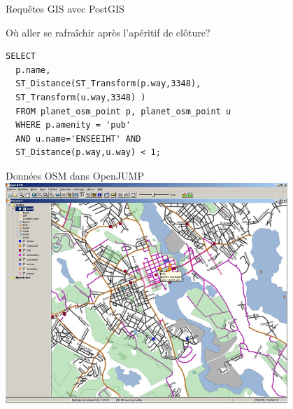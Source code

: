 \begin{frame}[fragile]{Requêtes GIS avec PostGIS} \vfill

Où aller se rafraîchir après l'apéritif de clôture?

\begin{verbatim}
SELECT
  p.name,
  ST_Distance(ST_Transform(p.way,3348),
  ST_Transform(u.way,3348) )
  FROM planet_osm_point p, planet_osm_point u
  WHERE p.amenity = 'pub'
  AND u.name='ENSEEIHT' AND
  ST_Distance(p.way,u.way) < 1;
\end{verbatim}

\end{frame}


\begin{frame}[fragile]{Données OSM dans OpenJUMP} \vfill
\includegraphics[width=0.8\textwidth]{figures/osm-openjump}
\end{frame}


